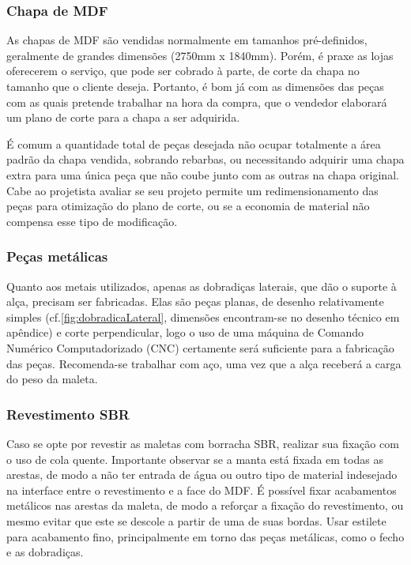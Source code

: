 \subsubsection{Chapa de MDF}
 As chapas de MDF são vendidas normalmente em tamanhos pré-definidos, geralmente de grandes dimensões (2750mm x 1840mm). Porém, é praxe as lojas oferecerem o serviço, que pode ser cobrado à parte, de corte da chapa no tamanho que o cliente deseja. Portanto, é bom já com as dimensões das peças com as quais pretende trabalhar na hora da compra, que o vendedor elaborará um plano de corte para a chapa a ser adquirida.
    \par É comum a quantidade total de peças desejada não ocupar totalmente a área padrão da chapa vendida, sobrando rebarbas, ou necessitando adquirir uma chapa extra para uma única peça que não coube junto com as outras na chapa original. Cabe ao projetista avaliar se seu projeto permite um redimensionamento das peças para otimização do plano de corte, ou se a economia de material não compensa esse tipo de modificação.
\subsubsection{Peças metálicas}
Quanto aos metais utilizados, apenas as dobradiças laterais, que dão o suporte à alça, precisam ser fabricadas. Elas são peças planas, de desenho relativamente simples (cf.\ref{fig:dobradicaLateral}, dimensões encontram-se no desenho técnico em apêndice) e corte perpendicular, logo o uso de uma máquina de Comando Numérico Computadorizado (CNC) certamente será suficiente para a fabricação das peças. Recomenda-se trabalhar com aço, uma vez que a alça receberá a carga do peso da maleta.

\subsubsection{Revestimento SBR}

Caso se opte por revestir as maletas com borracha SBR, realizar sua fixação com  o uso de cola quente. Importante observar se a manta está fixada em todas as arestas, de modo a não ter entrada de água ou outro tipo de material indesejado na interface entre o revestimento e a face do MDF. É possível fixar acabamentos metálicos nas arestas da maleta, de modo a reforçar a fixação do revestimento, ou mesmo evitar que este se descole a partir de uma de suas bordas.
Usar estilete para acabamento fino, principalmente em torno das peças metálicas, como o fecho e as dobradiças.

